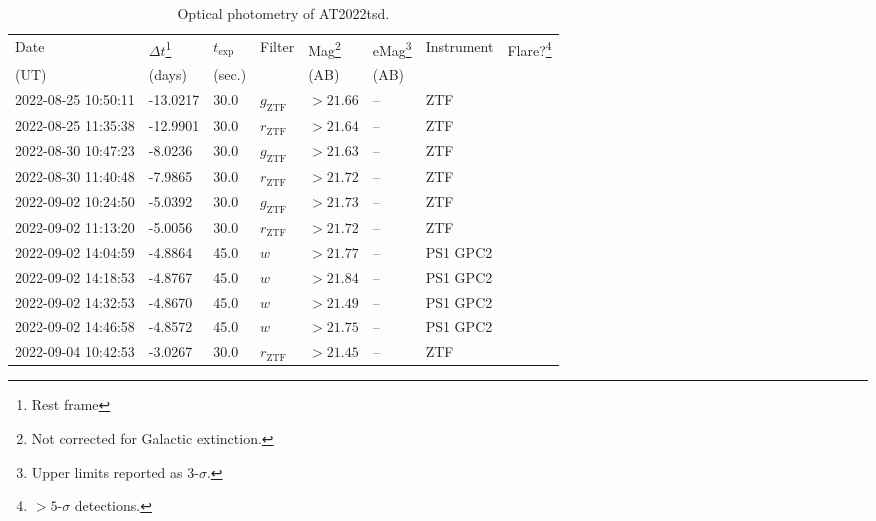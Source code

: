 \documentclass{nature_plusfigure}
\begin{document}
\clearpage

\begin{supplement}

\renewcommand{\thefigure}{Supplementary Information Figure~\arabic{figure}}
\renewcommand{\figurename}{}
\setcounter{figure}{0}
%


\renewcommand{\thetable}{Supplementary Information Table~\arabic{table}}
 \renewcommand{\tablename}{}
\setcounter{table}{0}

\begin{center} 
\begin{longtable}{llllllll} 
\caption{Optical photometry of AT2022tsd.} 
\label{tab:optical-photometry}\\ 
\hline\hline
Date & $\Delta t$\footnote{Rest frame} & $t_\mathrm{exp}$ & Filter & Mag\footnote{Not corrected for Galactic extinction.} & eMag\footnote{Upper limits reported as 3-$\sigma$.} & Instrument & Flare?\footnote{$>5$-$\sigma$ detections.}\\ 
(UT) & (days) & (sec.) &  & (AB) & (AB) &  & \\ 
\hline
2022-08-25 10:50:11 & -13.0217 & 30.0 & ${g}_\mathrm{ZTF}$ & $>21.66$ & -- & ZTF &  \\ 
2022-08-25 11:35:38 & -12.9901 & 30.0 & ${r}_\mathrm{ZTF}$ & $>21.64$ & -- & ZTF &  \\ 
2022-08-30 10:47:23 & -8.0236 & 30.0 & ${g}_\mathrm{ZTF}$ & $>21.63$ & -- & ZTF &  \\ 
2022-08-30 11:40:48 & -7.9865 & 30.0 & ${r}_\mathrm{ZTF}$ & $>21.72$ & -- & ZTF &  \\ 
2022-09-02 10:24:50 & -5.0392 & 30.0 & ${g}_\mathrm{ZTF}$ & $>21.73$ & -- & ZTF &  \\ 
2022-09-02 11:13:20 & -5.0056 & 30.0 & ${r}_\mathrm{ZTF}$ & $>21.72$ & -- & ZTF &  \\ 
2022-09-02 14:04:59 & -4.8864 & 45.0 & $w$ & $>21.77$ & -- & PS1 GPC2 &  \\ 
2022-09-02 14:18:53 & -4.8767 & 45.0 & $w$ & $>21.84$ & -- & PS1 GPC2 &  \\ 
2022-09-02 14:32:53 & -4.8670 & 45.0 & $w$ & $>21.49$ & -- & PS1 GPC2 &  \\ 
2022-09-02 14:46:58 & -4.8572 & 45.0 & $w$ & $>21.75$ & -- & PS1 GPC2 &  \\ 
2022-09-04 10:42:53 & -3.0267 & 30.0 & ${r}_\mathrm{ZTF}$ & $>21.45$ & -- & ZTF &  \\ 

\end{longtable}
\end{center}
\end{supplement}
\end{document}
